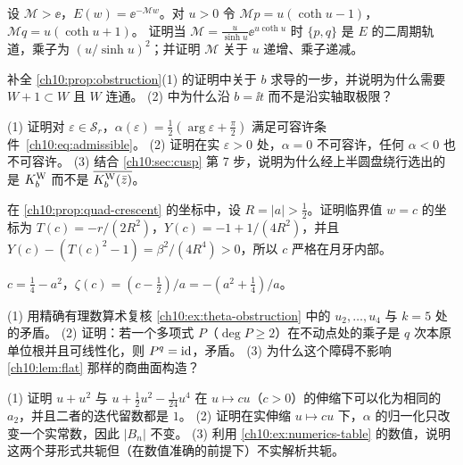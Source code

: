 \begin{exercise}\label{ch10:ex:two-cycle}
设 $\mathcal M>\ee$，$E(w)=\ee^{-\mathcal Mw}$。对 $u>0$ 令 $\mathcal Mp=u(\coth u-1)$，$\mathcal Mq=u(\coth u+1)$。
证明当 $\mathcal M=\frac{u}{\sinh u}\ee^{u\coth u}$ 时 $\{p,q\}$ 是 $E$ 的二周期轨道，乘子为 $(u/\sinh u)^2$；并证明 $\mathcal M$ 关于 $u$ 递增、乘子递减。
\end{exercise}

\begin{exercise}\label{ch10:ex:obstruction}
补全 \cref{ch10:prop:obstruction}(1) 的证明中关于 $b$ 求导的一步，并说明为什么需要 $W+1\subset W$ 且 $W$ 连通。
(2) 中为什么沿 $b=\ii t$ 而不是沿实轴取极限？
\end{exercise}

\begin{exercise}\label{ch10:ex:admissible}
(1) 证明对 $\varepsilon\in\mathcal S_r$，$\alpha(\varepsilon)=\tfrac12(\arg\varepsilon+\tfrac\pi2)$ 满足可容许条件~\eqref{ch10:eq:admissible}。
(2) 证明在实 $\varepsilon>0$ 处，$\alpha=0$ 不可容许，任何 $\alpha<0$ 也不可容许。
(3) 结合 \cref{ch10:sec:cusp} 第 7 步，说明为什么经上半圆盘绕行选出的是 $K^{\mathrm W}_b$ 而不是 $\overline{K^{\mathrm W}_b(\bar z)}$。
\end{exercise}

\begin{exercise}\label{ch10:ex:quad-mark}
在 \cref{ch10:prop:quad-crescent} 的坐标中，设 $R=|a|>\tfrac12$。证明临界值 $w=c$ 的坐标为
$T(c)=-r/(2R^2)$，$Y(c)=-1+1/(4R^2)$，并且 $Y(c)-(T(c)^2-1)=\beta^2/(4R^4)>0$，所以 $c$ 严格在月牙内部。
\end{exercise}
\begin{hint}
$c=\tfrac14-a^2$，$\zeta(c)=(c-\tfrac12)/a=-(a^2+\tfrac14)/a$。
\end{hint}

\begin{exercise}\label{ch10:ex:quad-resonance}
(1) 用精确有理数算术复核 \cref{ch10:ex:theta-obstruction} 中的 $u_2,\dots,u_4$ 与 $k=5$ 处的矛盾。
(2) 证明：若一个多项式 $P$（$\deg P\ge2$）在不动点处的乘子是 $q$ 次本原单位根并且可线性化，则 $P^q=\mathrm{id}$，矛盾。
(3) 为什么这个障碍不影响 \cref{ch10:lem:flat} 那样的商曲面构造？
\end{exercise}

\begin{exercise}\label{ch10:ex:formal}
(1) 证明 $u+u^2$ 与 $u+\tfrac12u^2-\tfrac1{24}u^4$ 在 $u\mapsto cu$（$c>0$）的伸缩下可以化为相同的 $a_2$，并且二者的迭代留数都是 $1$。
(2) 证明在实伸缩 $u\mapsto cu$ 下，$\alpha$ 的归一化只改变一个实常数，因此 $|B_n|$ 不变。
(3) 利用 \cref{ch10:ex:numerics-table} 的数值，说明这两个芽形式共轭但（在数值准确的前提下）不实解析共轭。
\end{exercise}

